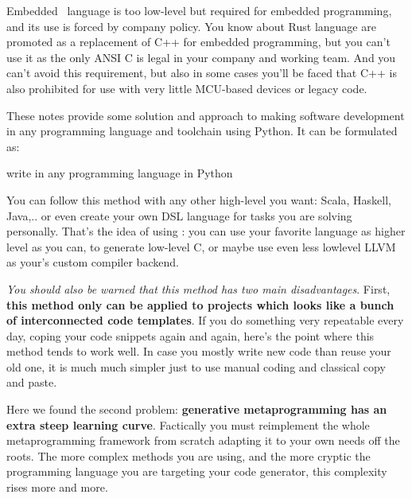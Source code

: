 
Embedded \emc\ language is too low-level but
required for embedded programming, and its use is forced by company policy. You
know about Rust language are promoted as a replacement of C++ for embedded
programming, but you can't use it as the only ANSI C is legal in your company
and working team. And you can't avoid this requirement, but also in some cases
you'll be faced that C++ is also prohibited for use with very little MCU-based
devices or legacy code.

These notes provide some solution and approach to making software development in
any programming language and toolchain using Python. It can be formulated as:
\begin{framed}\noindent\centering\LARGE
write in any programming language in Python
\end{framed}
You can follow this method with any other high-level  you
want: Scala, Haskell, Java,.. or even create your own DSL language for tasks you
are solving personally. That's the idea of using : you can use your favorite language as higher level as you can,
to generate low-level C, or maybe use even less lowlevel LLVM as your's custom
compiler backend.

\clearpage
\emph{You should also be warned that this method has two main disadvantages}.
First, \textbf{this method only can be applied to projects which looks like a
bunch of interconnected code templates}. If you do something very repeatable
every day, coping your code snippets again and again, here's the point where
this method tends to work well. In case you mostly write new code than reuse
your old one, it is much much simpler just to use manual coding and classical
copy and paste.

Here we found the second problem: \textbf{generative metaprogramming has an
extra steep learning curve}. Factically you must reimplement the whole
metaprogramming framework from scratch adapting it to your own needs off the
roots. The more complex methods you are using, and the more cryptic the
programming language you are targeting your code generator, this complexity
rises more and more.
